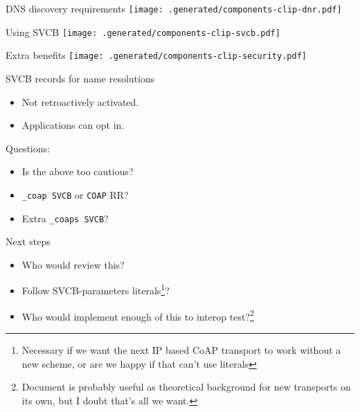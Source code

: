 \begin{frame}{DNS discovery requirements}
\vspace{-1cm}
\texttt{[image: .generated/components-clip-dnr.pdf]}
\end{frame}

\begin{frame}{Using SVCB}
\vspace{-1cm}
\texttt{[image: .generated/components-clip-svcb.pdf]}
\end{frame}

\begin{frame}{Extra benefits}
\vspace{-1cm}
\texttt{[image: .generated/components-clip-security.pdf]}
\end{frame}

\begin{frame}{SVCB records for name resolutions}\Large
  \begin{itemize}
    \item Not retroactively activated.
    \item Applications can opt in.
  \end{itemize}

  \bigskip

  Questions:

  \begin{itemize}
    \item Is the above too cautious?
    \item \texttt{\_coap SVCB} or \texttt{COAP} RR?
    \item Extra \texttt{\_coaps SVCB}?
  \end{itemize}
\end{frame}

\begin{frame}{Next steps}\Large
  \begin{itemize}
    \item Who would review this?
    \item Follow SVCB-parameters literals\footnote{Necessary if we want the next IP based CoAP transport to work without a new scheme, or are we happy if that can't use literals}?
    \item Who would implement enough of this to interop test?\footnote{Document is probably useful as theoretical background for new transports on its own, but I doubt that's all we want.}
  \end{itemize}
\end{frame}


